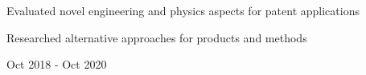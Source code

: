 \begin{detail}
\vspace{-2.5ex}
\BulletItem
Evaluated novel engineering and physics aspects for patent applications

\BulletItem
Researched alternative approaches for products and methods
\end{detail}

\begin{subtitle}
\vspace{-7.8ex}
{{Oct 2018 - Oct 2020}} 
\end{subtitle}

\begin{subtitle}
\vspace{-2.0ex}
\end{subtitle}

